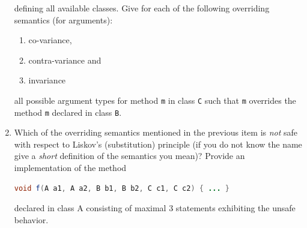 \documentclass{article}
\begin{document}
\begin{enumerate}
\begin{center}
\end{center}
defining all available classes. 
Give for each of the following overriding semantics (for arguments):
\begin{enumerate}
  \item co-variance,
  \item contra-variance and
  \item invariance
\end{enumerate}
all possible argument types for method \lstinline!m! in class
\lstinline!C! such that \lstinline!m! overrides the method
\lstinline!m! declared in class \lstinline!B!.  
\item Which of the overriding
  semantics mentioned in the previous item is \emph{not} safe with
  respect to Liskov's (substitution) principle (if you do not know the
  name give a \emph{short} definition of the semantics you mean)?
  Provide an implementation of the method
\begin{lstlisting}[language=Java, columns=flexible, basicstyle=\small]
void f(A a1, A a2, B b1, B b2, C c1, C c2) { ... }        
\end{lstlisting}
declared in class A consisting of maximal 3 statements exhibiting the
unsafe behavior. 


\end{enumerate}
\end{document}

